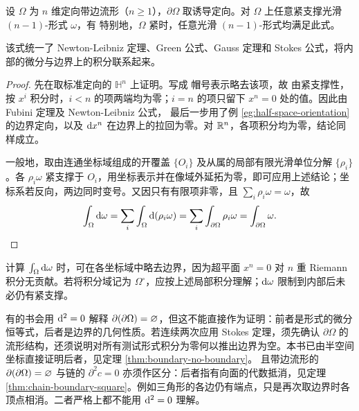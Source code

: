 \begin{theorem}[广义 Stokes 定理]
    设 $\Omega$ 为 $n$ 维定向带边流形（$n\geqslant1$），$\partial\Omega$ 取诱导定向。对 $\Omega$ 上任意紧支撑光滑 $(n-1)$-形式 $\omega$，有
    特别地，$\Omega$ 紧时，任意光滑 $(n-1)$-形式均满足此式。
\end{theorem}
\begin{remark}
    该式统一了 Newton-Leibniz 定理、Green 公式、Gauss 定理和 Stokes 公式，将内部的微分与边界上的积分联系起来。
\end{remark}
\begin{proof}
    先在取标准定向的 $\mathbb H^n$ 上证明。写成
    帽号表示略去该项，故
    由紧支撑性，按 $x^i$ 积分时，$i<n$ 的项两端均为零；$i=n$ 的项只留下 $x^n=0$ 处的值。因此由 Fubini 定理及 Newton-Leibniz 公式，
    最后一步用了例 \ref{eg:half-space-orientation} 的边界定向，以及 $\dd x^n$ 在边界上的拉回为零。对 $\mathbb{R}^n$，各项积分均为零，结论同样成立。

    一般地，取由连通坐标域组成的开覆盖 $\{O_i\}$ 及从属的局部有限光滑单位分解 $\{\rho_i\}$。各 $\rho_i\omega$ 紧支撑于 $O_i$，用坐标表示并在像域外延拓为零，即可应用上述结论；坐标系若反向，两边同时变号。又因只有有限项非零，且 $\sum_i\rho_i\omega=\omega$，故
    \[\int_\Omega\dd\omega
        =\sum_i\int_\Omega\dd(\rho_i\omega)
        =\sum_i\int_{\partial\Omega}\rho_i\omega
        =\int_{\partial\Omega}\omega.\qedhere\]
\end{proof}
\begin{remark}
    计算 $\int_\Omega\dd\omega$ 时，可在各坐标域中略去边界，因为超平面 $x^n=0$ 对 $n$ 重 Riemann 积分无贡献。若将积分域记为 $\Omega^\circ$，应按上述局部积分理解；$\dd\omega$ 限制到内部后未必仍有紧支撑。

    有的书会用 $\dd^2=0$ 解释 $\partial(\partial\Omega)=\varnothing$，但这不能直接作为证明：前者是形式的微分恒等式，后者是边界的几何性质。若连续两次应用 Stokes 定理，须先确认 $\partial\Omega$ 的流形结构，还须说明对所有测试形式积分为零何以推出边界为空。本书已由半空间坐标直接证明后者，见定理 \ref{thm:boundary-no-boundary}。
且带边流形的 $\partial(\partial\Omega)=\varnothing$ 与链的 $\partial^2c=0$ 亦须作区分：后者指有向面的代数抵消，见定理 \ref{thm:chain-boundary-square}。例如三角形的各边仍有端点，只是再次取边界时各顶点相消。二者严格上都不能用 $\dd^2=0$ 理解。
\end{remark}

